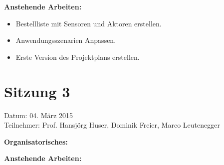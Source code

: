 \textbf{Anstehende Arbeiten:}
\begin{itemize}
	\item Bestellliste mit Sensoren und Aktoren erstellen.
	\item Anwendungsszenarien Anpassen.
	\item Erste Version des Projektplans erstellen.
\end{itemize}

\section*{Sitzung 3}
Datum: 04. März 2015 \\
Teilnehmer: Prof. Hansjörg Huser, Dominik Freier, Marco Leutenegger

\textbf{Organisatorisches:}

\textbf{Anstehende Arbeiten:}

